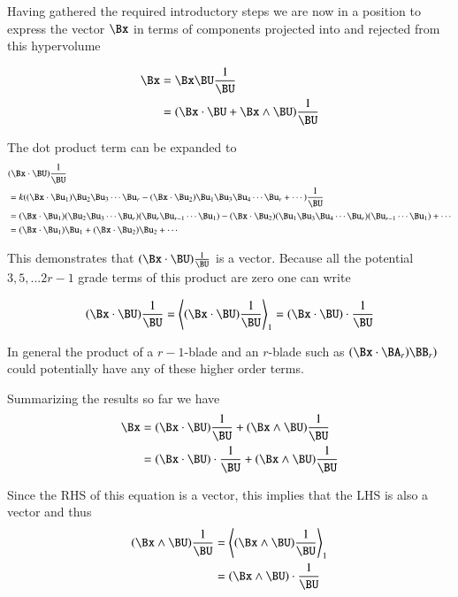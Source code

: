 Having gathered the required introductory steps we are now in a position to express the vector $\Bx$ in terms
of components projected into and rejected from this hypervolume

\begin{align*}
\Bx &= \Bx \BU \frac{1}{\BU} \\
    &= (\Bx \cdot \BU + \Bx \wedge \BU)\frac{1}{\BU} \\
\end{align*}

The dot product term can be expanded to
\begin{align*}
&(\Bx \cdot \BU) \frac{1}{\BU}  \\
&= k(
      (\Bx \cdot \Bu_1)\Bu_2\Bu_3\cdots\Bu_r
    - (\Bx \cdot \Bu_2)\Bu_1\Bu_3\Bu_4\cdots\Bu_r
    + \cdots
    ) \frac{1}{\BU} \\
&= 
  (\Bx \cdot \Bu_1)(\Bu_2\Bu_3\cdots\Bu_r)(\Bu_r\Bu_{r-1}\cdots\Bu_1)
- (\Bx \cdot \Bu_2)(\Bu_1\Bu_3\Bu_4\cdots\Bu_r)(\Bu_{r-1}\cdots\Bu_1)
+ \cdots \\
&= 
  (\Bx \cdot \Bu_1)\Bu_1
+ (\Bx \cdot \Bu_2)\Bu_2
+ \cdots \\
\end{align*}

This demonstrates that $(\Bx \cdot \BU) \frac{1}{\BU}$ is a vector.  Because all the potential $3, 5, ... 2r-1$ grade terms of this product are zero one can write

\[
(\Bx \cdot \BU) \frac{1}{\BU} = \left<(\Bx \cdot \BU) \frac{1}{\BU}\right>_1 = (\Bx \cdot \BU) \cdot \frac{1}{\BU}
\]

In general the product of a $r-1$-blade and an $r$-blade such as $(\Bx \cdot \BA_r)\BB_r)$ could potentially have any of these higher order terms.

Summarizing the results so far we have
\begin{align*}
\Bx
&= (\Bx \cdot \BU)\frac{1}{\BU} + (\Bx \wedge \BU)\frac{1}{\BU} \\
&= (\Bx \cdot \BU) \cdot \frac{1}{\BU} + (\Bx \wedge \BU)\frac{1}{\BU} \\
\end{align*}

Since the RHS of this equation is a vector, this implies that the LHS is also a vector and thus
\begin{align*}
(\Bx \wedge \BU)\frac{1}{\BU} 
&= \left<(\Bx \wedge \BU)\frac{1}{\BU}\right>_1 \\
&= (\Bx \wedge \BU) \cdot \frac{1}{\BU} \\
\end{align*}

